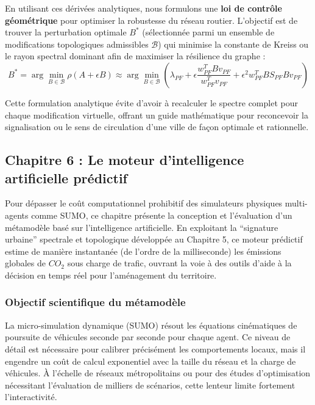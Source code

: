 \documentclass[10pt, a4paper]{article}
\begin{document}
En utilisant ces dérivées analytiques, nous formulons une \textbf{loi de
contrôle géométrique} pour optimiser la robustesse du réseau routier.
L'objectif est de trouver la perturbation optimale \(B^*\) (sélectionnée
parmi un ensemble de modifications topologiques admissibles
\(\mathcal{B}\)) qui minimise la constante de Kreiss ou le rayon
spectral dominant afin de maximiser la résilience du graphe :
\[B^* = \arg\min_{B \in \mathcal{B}} \rho(A + \epsilon B) \approx \arg\min_{B \in \mathcal{B}} \left( \lambda_{PF} + \epsilon \frac{w_{PF}^T B v_{PF}}{w_{PF}^T v_{PF}} + \epsilon^2 w_{PF}^T B S_{PF} B v_{PF} \right)\]

Cette formulation analytique évite d'avoir à recalculer le spectre
complet pour chaque modification virtuelle, offrant un guide
mathématique pour reconcevoir la signalisation ou le sens de circulation
d'une ville de façon optimale et rationnelle.

\newpage

\subsection{Chapitre 6 : Le moteur d'intelligence artificielle
prédictif}\label{chapitre-6-le-moteur-dintelligence-artificielle-pruxe9dictif}

Pour dépasser le coût computationnel prohibitif des simulateurs
physiques multi-agents comme SUMO, ce chapitre présente la conception et
l'évaluation d'un métamodèle basé sur l'intelligence artificielle. En
exploitant la ``signature urbaine'' spectrale et topologique développée
au Chapitre 5, ce moteur prédictif estime de manière instantanée (de
l'ordre de la milliseconde) les émissions globales de \(CO_2\) sous
charge de trafic, ouvrant la voie à des outils d'aide à la décision en
temps réel pour l'aménagement du territoire.

\subsubsection{Objectif scientifique du
métamodèle}\label{objectif-scientifique-du-muxe9tamoduxe8le}

La micro-simulation dynamique (SUMO) résout les équations cinématiques
de poursuite de véhicules seconde par seconde pour chaque agent. Ce
niveau de détail est nécessaire pour calibrer précisément les
comportements locaux, mais il engendre un coût de calcul exponentiel
avec la taille du réseau et la charge de véhicules. À l'échelle de
réseaux métropolitains ou pour des études d'optimisation nécessitant
l'évaluation de milliers de scénarios, cette lenteur limite fortement
l'interactivité.
\end{document}
